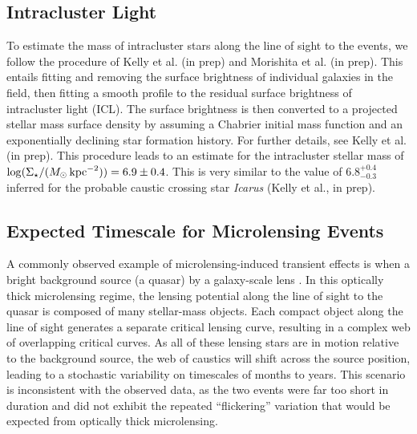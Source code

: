 \subsection{Intracluster Light}\label{sec:ICL}

To estimate the mass of intracluster stars along the line of sight to
the \spock events, we follow the procedure of Kelly et al. (in prep)
and Morishita et al. (in prep).  This entails fitting and removing the
surface brightness of individual galaxies in the field, then fitting a
smooth profile to the residual surface brightness of intracluster
light (ICL).  The surface brightness is then converted to a projected
stellar mass surface density by assuming a Chabrier
\citeyear{Chabrier:2003} initial mass function and an exponentially
declining star formation history.  For further details, see Kelly et
al. (in prep).  This procedure leads to an estimate for the
intracluster stellar mass of
$\log (\Sigma_{\star} / (M_{\odot}\,{\rm kpc}^{-2})) = 6.9\pm0.4$.
This is very similar to the value of $6.8^{+0.4}_{-0.3}$ inferred for
the probable caustic crossing star {\it Icarus} (Kelly et al., in
prep).


\subsection{Expected Timescale for Microlensing Events}\label{sec:Microlensing}

A commonly observed example of microlensing-induced transient effects
is when a bright background source (a quasar) by a galaxy-scale lens
\citep{Wambsganss:2001, Kochanek:2004}.  In this optically thick
microlensing regime, the lensing potential along the line of sight to
the quasar is composed of many stellar-mass objects.  Each compact
object along the line of sight generates a separate critical lensing
curve, resulting in a complex web of overlapping critical curves. As
all of these lensing stars are in motion relative to the background
source, the web of caustics will shift across the source position,
leading to a stochastic variability on timescales of months to years.
This scenario is inconsistent with the observed data, as the two
\spock events were far too short in duration and did not exhibit the
repeated ``flickering'' variation that would be expected from
optically thick microlensing.

